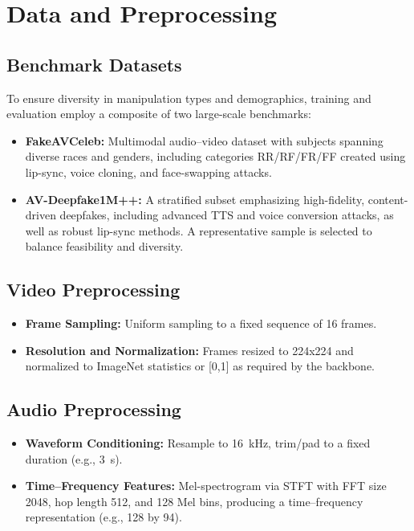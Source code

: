 \section{Data and Preprocessing}
\subsection{Benchmark Datasets}
To ensure diversity in manipulation types and demographics, training and evaluation employ a composite of two large-scale benchmarks:
\begin{itemize}
    \item \textbf{FakeAVCeleb:} Multimodal audio–video dataset with subjects spanning diverse races and genders, including categories RR/RF/FR/FF created using lip-sync, voice cloning, and face-swapping attacks. \cite{fakeavceleb2021}
    \item \textbf{AV-Deepfake1M++:} A stratified subset emphasizing high-fidelity, content-driven deepfakes, including advanced TTS and voice conversion attacks, as well as robust lip-sync methods. A representative sample is selected to balance feasibility and diversity.
\end{itemize}

\subsection{Video Preprocessing}
\begin{itemize}
    \item \textbf{Frame Sampling:} Uniform sampling to a fixed sequence of 16 frames.
    \item \textbf{Resolution and Normalization:} Frames resized to 224x224 and normalized to ImageNet statistics or [0,1] as required by the backbone.
\end{itemize}

\subsection{Audio Preprocessing}
\begin{itemize}
    \item \textbf{Waveform Conditioning:} Resample to 16~kHz, trim/pad to a fixed duration (e.g., 3~s).
    \item \textbf{Time–Frequency Features:} Mel-spectrogram via STFT with FFT size 2048, hop length 512, and 128 Mel bins, producing a time–frequency representation (e.g., 128 by 94). \cite{griffinlim1984}
\end{itemize}

